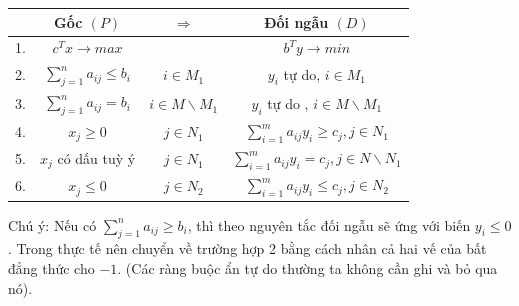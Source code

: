 \documentclass{article}
\begin{document}
\begin{center}
    \begin{tabular}{|c|c|c|c|}
        \hline
        & Gốc $(P)$ & $\Rightarrow$ & Đối ngẫu $(D)$ \\
        \hline
        1. & $c^Tx \rightarrow max$ && $b^Ty \rightarrow min$ \\
        \hline
        2. &  $\sum_{j=1}^n a_{ij} \leq b_i$ & $i \in M_1$ & $y_i$ tự do, $i \in M_1$ \\
        \hline
        3. & $\sum_{j=1}^n a_{ij} = b_i$ & $i \in M \backslash M_1$ & $y_i$ tự do , $i \in M\backslash M_1$ \\
        \hline
        4. & $x_j \geq 0$ & $j \in N_1$ & $\sum_{i=1}^m a_{ij}y_i \geq c_j , j \in N_1$ \\
        \hline
        5. & $x_j$ có dấu tuỳ ý & $j \in N_1$ & $\sum_{i=1}^m a_{ij} y_i = c_j , j \in N\backslash N_1$ \\
        \hline
        6. & $x_j \leq 0$ & $j \in N_2$ & $\sum_{i=1}^m a_{ij}y_i \leq c_j , j \in N_2$ \\
        \hline
    \end{tabular}
\end{center}
Chú ý: Nếu có $\sum_{j=1}^n a_{ij} \geq b_i$, thì theo nguyên tắc đối ngẫu sẽ ứng với biến $y_i \leq 0$. Trong thực tế nên chuyển về trường hợp 2 bằng cách nhân cả hai vế của bất đẳng thức cho $-1$. (Các ràng buộc ẩn tự do thường ta không cần ghi và bỏ qua nó).
\end{document}

